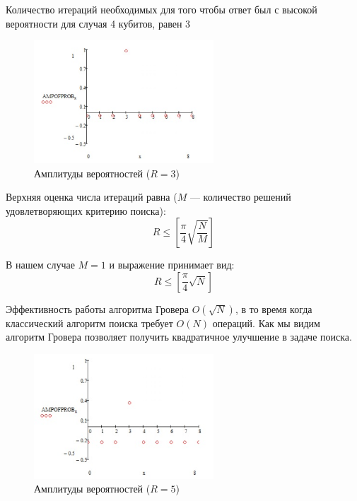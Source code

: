 \documentclass{article}
\begin{document}
Количество итераций необходимых для того чтобы ответ был с высокой вероятности
для случая 4 кубитов, равен 3


\begin{figure}[H]
  \centering
  \includegraphics[width=0.6\textwidth]{graf_4_2}
  \caption{Амплитуды вероятностей ($R=3$)}\label{fig:42}
\end{figure}

Верхняя оценка числа итераций равна ($M$ --- количество решений удовлетворяющих
критерию поиска): 
\begin{equation}
  R \leqslant \left[\frac{\pi}{4} \sqrt{\frac{N}{M}}\right]
\end{equation}

В нашем случае $M = 1$ и выражение принимает вид:
\begin{equation}
  R \leqslant \left[\frac{\pi}{4} \sqrt{N}\right]
\end{equation}

Эффективность работы алгоритма Гровера $O(\sqrt{N})$, в то время когда
классический алгоритм поиска требует $O(N)$ операций. Как мы видим алгоритм
Гровера позволяет получить квадратичное улучшение в задаче поиска.

\begin{figure}[H]
  \centering
  \includegraphics[width=0.6\textwidth]{graf_4_3}
  \caption{Амплитуды вероятностей ($R=5$)}\label{fig:43}
\end{figure}
\end{document}
